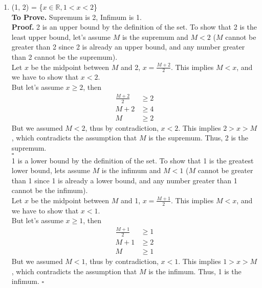\documentclass[11pt]{article}
\begin{document}
\begin{enumerate}
\begin{enumerate}
		      \item (1, 2) = \{$x \in \mathbb{R}, 1 < x < 2$\}\\
		            \textbf{To Prove.} Supremum is 2, Infimum is 1.\\
		            \textbf{Proof.} 2 is an upper bound by the definition of the set. To show that 2 is the least upper bound, let's assume $M$ is the supremum and $M < 2$ ($M$ cannot be greater than 2 since 2 is already an upper bound, and any number greater than 2 cannot be the supremum).\\
		            Let $x$ be the midpoint between $M$ and 2, $x = \frac{M + 2}{2}$. This implies $M < x$, and we have to show that $x < 2$.\\
		            But let's assume $x \geq 2$, then
		            \begin{align*}
			            \frac{M + 2}{2} & \geq 2 \\
			            M + 2           & \geq 4 \\
			            M               & \geq 2
		            \end{align*}
		            But we assumed $M < 2$, thus by contradiction, $x < 2$. This implies $2 > x > M$, which contradicts the assumption that $M$ is the supremum. Thus, 2 is the supremum.\\
		            $\square$\\


		            1 is a lower bound by the definition of the set. To show that 1 is the greatest lower bound, lets assume $M$ is the infimum and $M < 1$ ($M$ cannot be greater than 1 since 1 is already a lower bound, and any number greater than 1 cannot be the infimum).\\
		            Let $x$ be the midpoint between $M$ and 1, $x = \frac{M + 1}{2}$. This implies $M < x$, and we have to show that $x < 1$.\\
		            But let's assume $x \geq 1$, then
		            \begin{align*}
			            \frac{M + 1}{2} & \geq 1 \\
			            M + 1           & \geq 2 \\
			            M               & \geq 1
		            \end{align*}
		            But we assumed $M < 1$, thus by contradiction, $x < 1$. This implies $1 > x > M$, which contradicts the assumption that $M$ is the infimum. Thus, 1 is the infimum.
		            $\square$
	      \end{enumerate}
\end{enumerate}
\end{document}
